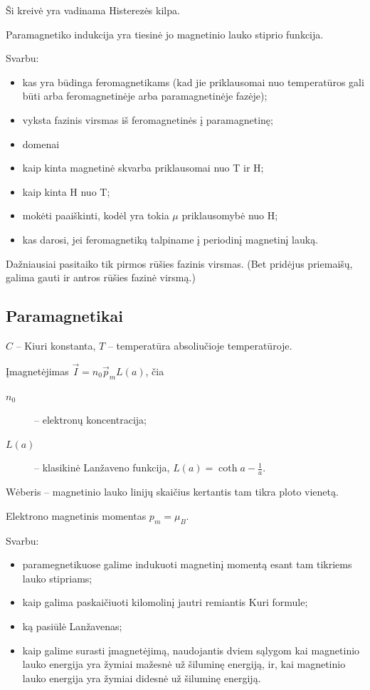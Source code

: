 Ši kreivė yra vadinama Histerezės kilpa.

Paramagnetiko indukcija yra tiesinė jo magnetinio lauko stiprio
funkcija.

Svarbu:
\begin{itemize}
  \item kas yra būdinga feromagnetikams (kad jie priklausomai nuo
    temperatūros gali būti arba feromagnetinėje arba paramagnetinėje
    fazėje);
  \item vyksta fazinis virsmas iš feromagnetinės į paramagnetinę;
  \item domenai
  \item kaip kinta magnetinė skvarba priklausomai nuo T ir H;
  \item kaip kinta H nuo T;
  \item mokėti paaiškinti, kodėl yra tokia $\mu$ priklausomybė nuo H;
  \item kas darosi, jei feromagnetiką talpiname į periodinį magnetinį
    lauką.
\end{itemize}
Dažniausiai pasitaiko tik pirmos rūšies fazinis virsmas. (Bet pridėjus
priemaišų, galima gauti ir antros rūšies fazinė virsmą.)

\subsection{Paramagnetikai}

$C$ – Kiuri konstanta,
$T$ – temperatūra absoliučioje temperatūroje.

Įmagnetėjimas $\vec{I} = n_{0}\vec{p}_{m}L(a)$, čia
\begin{description}
  \item[$n_{0}$] – elektronų koncentracija;
  \item[$L(a)$] – klasikinė Lanžaveno funkcija,
    $L(a) = \coth a - \frac{1}{a}$.
\end{description}

Wėberis – magnetinio lauko linijų skaičius kertantis tam tikra ploto
vienetą.

Elektrono magnetinis momentas $p_{m} = \mu_{B}$.

Svarbu:
\begin{itemize}
  \item paramegnetikuose galime indukuoti magnetinį momentą esant
    tam tikriems lauko stipriams;
  \item kaip galima paskaičiuoti kilomolinį jautri remiantis Kuri
    formule;
  \item ką pasiūlė Lanžavenas;
  \item kaip galime surasti įmagnetėjimą, naudojantis dviem sąlygom
    kai magnetinio lauko energija yra žymiai mažesnė už šiluminę
    energiją, ir, kai magnetinio lauko energija yra žymiai didesnė
    už šiluminę energiją.
\end{itemize}

